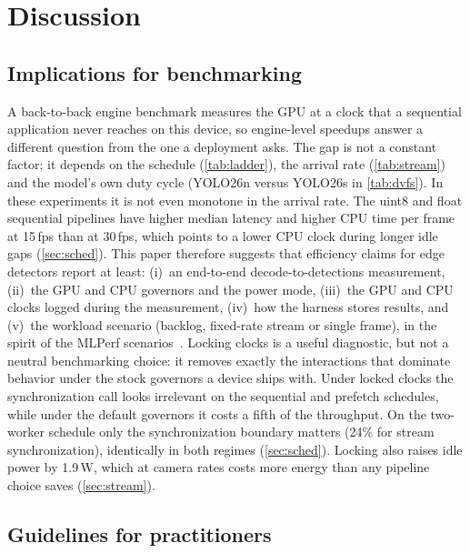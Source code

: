 \section{Discussion}
\label{sec:discussion}

\subsection{Implications for benchmarking}

A back-to-back engine benchmark measures the GPU at a clock that a
sequential application never reaches on this device, so engine-level
speedups answer a different question from the one a deployment asks.
The gap is not a constant factor; it depends on the schedule (\cref{tab:ladder}), the arrival rate (\cref{tab:stream}) and
the model's own duty cycle (YOLO26n versus YOLO26s in
\cref{tab:dvfs}). In these experiments it is not even monotone in the
arrival rate. The uint8 and float sequential pipelines have higher
median latency and higher CPU time per frame at 15\,fps than at
30\,fps, which points to a lower CPU clock during longer idle gaps
(\cref{sec:sched}).
This paper therefore suggests that efficiency claims for edge detectors
report at least: (i)~an end-to-end decode-to-detections measurement,
(ii)~the GPU and CPU governors and the power mode, (iii)~the GPU and
CPU clocks logged during the measurement, (iv)~how the harness stores
results, and (v)~the workload scenario (backlog, fixed-rate stream or
single frame), in the spirit of the MLPerf
scenarios~\cite{reddi2020mlperf}. Locking clocks is a useful
diagnostic, but not a neutral benchmarking choice: it removes exactly
the interactions that dominate behavior under the stock governors a
device ships with. Under locked clocks the synchronization call looks
irrelevant on the sequential and prefetch schedules, while under the
default governors it costs a fifth of the throughput. On the two-worker
schedule only the synchronization boundary matters (24\% for stream
synchronization), identically in both regimes (\cref{sec:sched}).
Locking also raises idle power by 1.9\,W, which at camera rates costs
more energy than any pipeline choice saves (\cref{sec:stream}).

\subsection{Guidelines for practitioners}


